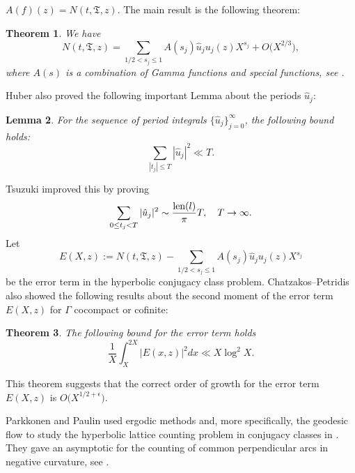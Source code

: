 \documentclass[a4paper,11pt]{amsart}
\newtheorem{theorem}{Theorem}[section]
\newtheorem{lem}[theorem]{Lemma}
\theoremstyle{definition}
\begin{document}
$A(f)(z)= N(t,\mathfrak{T},z)$. The main result is the following theorem:
\begin{theorem}\rm \cite[p. 983]{CP}\label{CPthm}
We have
$$N(t,\mathfrak{T},z)=\sum_{1/2<s_j\le1}A(s_j)\hat{u}_ju_j(z)X^{s_j}+O\big(X^{2/3}\big),$$
where $A(s)$ is a combination of Gamma functions and special functions, see \cite[Eq. 1.5]{CP}. 
\end{theorem}
Huber also proved the following important Lemma about the periods $\hat{u}_j$:
\begin{lem}\label{periods}
For the sequence of period integrals $\{\hat{u}_j\}_{j=0}^{\infty}$, the following bound holds:
$$\sum_{|t_j|\le T}|\hat{u}_j|^2\ll T.$$
\end{lem}
Tsuzuki \cite[Th. 1, p.~2388]{Tsuz} improved this by proving
$$ \sum_{0 \le t_j < T}|\hat{u}_j|^2 \sim  \frac{\hbox{len}(l)}{\pi}T, \quad T \to \infty .$$
Let $$E(X,z):=N(t,\mathfrak{T},z)-\sum_{1/2<s_j\le1}A(s_j)\hat{u}_ju_j(z)X^{s_j}$$
be the error term in the hyperbolic conjugacy class problem. Chatzakos--Petridis also showed the following results about the second moment of the error term $E(X,z)$ for $\Gamma$ cocompact or cofinite:
\begin{theorem}\rm \cite[Th. 1.2]{CP}\label{secondmomC}
The following bound for the error term holds 
$$ \frac{1}{X}\int_X^{2X}|E(x,z)|^2dx \ll X\log^2X.$$
\end{theorem}

This theorem suggests that the correct order of growth for the error term $E(X,z)$ is $O\big(X^{1/2+\epsilon}\big)$.\par



Parkkonen and Paulin used ergodic methods and, more specifically, the geodesic flow to study the hyperbolic lattice counting problem in conjugacy classes in \cite{PP}. They gave an asymptotic for the counting of common perpendicular arcs in negative curvature, see \cite[Th.~1, p.~901] {parkkonen_paulin_2017}.


\end{document}
